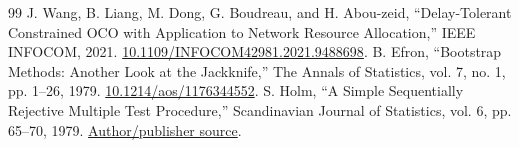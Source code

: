 \documentclass{IEEEoj}
\begin{document}
\begin{thebibliography}{99}
 J. Wang, B. Liang, M. Dong, G. Boudreau, and H. Abou-zeid, ``Delay-Tolerant Constrained OCO with Application to Network Resource Allocation,'' IEEE INFOCOM, 2021. \href{https://doi.org/10.1109/INFOCOM42981.2021.9488698}{10.1109/INFOCOM42981.2021.9488698}.
 B. Efron, ``Bootstrap Methods: Another Look at the Jackknife,'' The Annals of Statistics, vol. 7, no. 1, pp. 1--26, 1979. \href{https://doi.org/10.1214/aos/1176344552}{10.1214/aos/1176344552}.
 S. Holm, ``A Simple Sequentially Rejective Multiple Test Procedure,'' Scandinavian Journal of Statistics, vol. 6, pp. 65--70, 1979. \href{https://www.jstor.org/stable/4615733}{Author/publisher source}.
\end{thebibliography}
\end{document}
